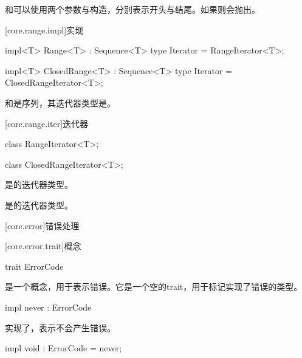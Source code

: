 \pnum
{}和可以使用两个参数与构造，分别表示开头与结尾。如果则会抛出。

[core.range.impl]{实现}

\begin{itemdecl}
impl<T> Range<T> : Sequence<T> {
    type Iterator = RangeIterator<T>;
}
\end{itemdecl}

\begin{itemdecl}
impl<T> ClosedRange<T> : Sequence<T> {
    type Iterator = ClosedRangeIterator<T>;
}
\end{itemdecl}

\pnum
{}和是序列，其迭代器类型是。

[core.range.iter]{迭代器}

\begin{itemdecl}
class RangeIterator<T>;
\end{itemdecl}

\begin{itemdecl}
class ClosedRangeIterator<T>;
\end{itemdecl}

\pnum
{}是的迭代器类型。

\pnum
{}是的迭代器类型。

[core.error]{错误处理}

[core.error.trait]{概念}

\begin{itemdecl}
trait ErrorCode { }
\end{itemdecl}

\pnum
{}是一个概念，用于表示错误。它是一个空的trait，用于标记实现了错误的类型。

\begin{itemdecl}
impl never : ErrorCode { }
\end{itemdecl}

\pnum
{}实现了，表示不会产生错误。

\begin{itemdecl}
impl void : ErrorCode = never;
\end{itemdecl}

